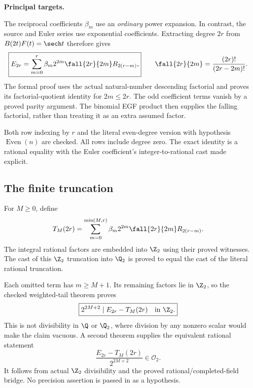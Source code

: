 \textbf{Principal targets.}\par
{}\par
{}\par
{}
\par\medskip
{}
The reciprocal coefficients $\beta_m$ use an \emph{ordinary} power expansion. In contrast, the source and Euler series use exponential coefficients. Extracting degree $2r$ from $B(2t)F(t)=\sech t$ therefore gives
\[
 \boxed{E_{2r}=\sum_{m=0}^{r}\beta_m2^{2m}\fall{2r}{2m}R_{2(r-m)},}
 \qquad
 \fall{2r}{2m}=\frac{(2r)!}{(2r-2m)!}.
\]
The formal proof uses the actual natural-number descending factorial and proves its factorial-quotient identity for $2m\leq2r$. The odd coefficient terms vanish by a proved parity argument. The binomial EGF product then supplies the falling factorial, rather than treating it as an extra assumed factor.

Both row indexing by $r$ and the literal even-degree version with hypothesis $\operatorname{Even}(n)$ are checked. All rows include degree zero. The exact identity is a rational equality with the Euler coefficient's integer-to-rational cast made explicit.

\subsection*{The finite truncation}
For $M\geq0$, define
\[
 T_M(2r)=\sum_{m=0}^{\min(M,r)}\beta_m2^{2m}\fall{2r}{2m}R_{2(r-m)}.
\]
The integral rational factors are embedded into $\Z_2$ using their proved witnesses. The cast of this $\Z_2$ truncation into $\Q_2$ is proved to equal the cast of the literal rational truncation.

Each omitted term has $m\geq M+1$. Its remaining factors lie in $\Z_2$, so the checked weighted-tail theorem proves
\[
 \boxed{2^{2M+2}\mid E_{2r}-T_M(2r)\quad\text{in }\Z_2.}
\]
This is not divisibility in $\Q$ or $\Q_2$, where division by any nonzero scalar would make the claim vacuous. A second theorem supplies the equivalent rational statement
\[
 \boxed{\frac{E_{2r}-T_M(2r)}{2^{2M+2}}\in\mathcal O_2.}
\]
It follows from actual $\Z_2$ divisibility and the proved rational/completed-field bridge. No precision assertion is passed in as a hypothesis.

